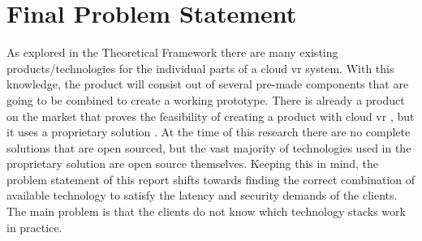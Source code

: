 \section{Final Problem Statement}
\label{sec:fps}

As explored in the Theoretical Framework there are many existing products/technologies for the individual parts of a cloud \acrshort{vr} system. With this knowledge, the product will consist out of several pre-made components that are going to be combined to create a working prototype. There is already a product on the market that proves the feasibility of creating a product with cloud \acrshort{vr} \parencite{zerolight5g}, but it uses a proprietary solution \parencite{cloudxr}. At the time of this research there are no complete solutions that are open sourced, but the vast majority of technologies used in the proprietary solution are open source themselves. Keeping this in mind, the problem statement of this report shifts towards finding the correct combination of available technology to satisfy the latency and security demands of the clients. The main problem is that the clients do not know which technology stacks work in practice. 